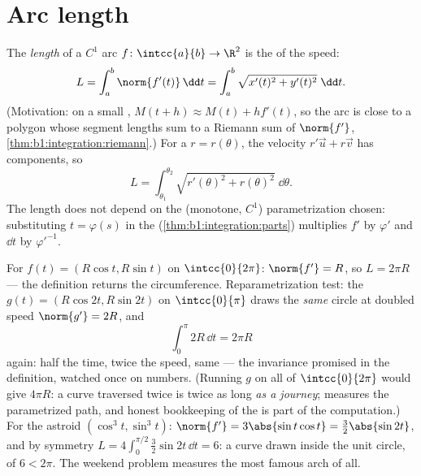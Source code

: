 \section{Arc length}

\begin{definition}\label{def:b1:curves:arclength}
The \emph{length} of a $C^1$ arc $f \colon
\intcc{a}{b} \to \R^2$ is the  of the speed:
\[
L = \int_a^b \norm{f'(t)}\,\dd t
= \int_a^b \sqrt{x'(t)^2 + y'(t)^2}\;\dd t .
\]
(Motivation: on a small , $M(t + h) \approx M(t) + h
f'(t)$, so the arc is close to a polygon whose segment lengths sum
to a Riemann sum of $\norm{f'}$,
\cref{thm:b1:integration:riemann}.) For a  $r =
r(\theta)$, the velocity $r'\vec u + r\vec v$ has 
components, so
\[
L = \int_{\theta_1}^{\theta_2}
\sqrt{r'(\theta)^2 + r(\theta)^2}\;\dd\theta .
\]
The length does not depend on the (monotone, $C^1$)
parametrization chosen: substituting $t = \varphi(s)$ in the
 (\cref{thm:b1:integration:parts}) multiplies $f'$ by
$\varphi'$ and $\dd t$ by $\varphi'^{-1}$.
\end{definition}

\begin{example}\label{ex:b1:curves:circlelength}
For $f(t) = (R\cos t, R\sin t)$ on $\intcc{0}{2\pi}$: $\norm{f'} =
R$, so $L = 2\pi R$ --- the definition returns the circumference.
Reparametrization test: the  $g(t) = (R\cos 2t, R\sin 2t)$ on
$\intcc{0}{\pi}$ draws the \emph{same} circle at doubled speed
$\norm{g'} = 2R$, and
\[
\int_0^{\pi} 2R\,\dd t = 2\pi R
\]
again: half the time, twice the speed, same  --- the
invariance promised in the definition, watched once on numbers.
(Running $g$ on all of $\intcc{0}{2\pi}$ would give $4\pi R$: a
curve traversed twice is twice as long \emph{as a journey};
 measures the parametrized path, and honest bookkeeping of
the  is part of the computation.)
For the astroid $(\cos^3t, \sin^3t)$: $\norm{f'} = 3\abs{\sin
t\cos t} = \tfrac32\abs{\sin 2t}$, and by symmetry $L = 4\int_0^{\pi/2}
\tfrac32\sin 2t\,\dd t = 6$: a curve drawn inside the unit circle,
of  $6 < 2\pi$. The weekend problem measures the most famous
arch of all.
\end{example}

